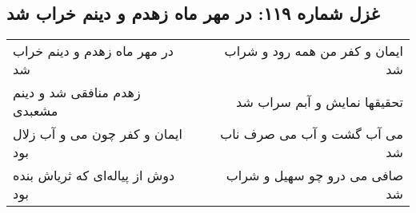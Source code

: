 \begin{center}
\section*{غزل شماره ۱۱۹: در مهر ماه زهدم و دینم خراب شد}
\label{sec:119}
\begin{longtable}{l p{0.5cm} r}
در مهر ماه زهدم و دینم خراب شد
&&
ایمان و کفر من همه رود و شراب شد
\\
زهدم منافقی شد و دینم مشعبدی
&&
تحقیقها نمایش و آبم سراب شد
\\
ایمان و کفر چون می و آب زلال بود
&&
می آب گشت و آب می صرف ناب شد
\\
دوش از پیاله‌ای که ثریاش بنده بود
&&
صافی می درو چو سهیل و شراب شد
\\
\end{longtable}
\end{center}
